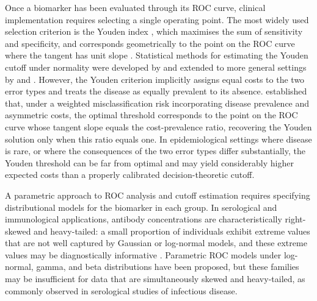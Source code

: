 \documentclass[11pt,a4paper]{article}
\theoremstyle{definition}
\theoremstyle{remark}
\newcommand{\1}{\mathbf{1}}
\begin{document}
Once a biomarker has been evaluated through its ROC curve, clinical
implementation requires selecting a single operating point. The most
widely used selection criterion is the Youden index
\citep{youden1950index}, which maximises the sum of sensitivity and
specificity, and corresponds geometrically to the point on the ROC curve
where the tangent has unit slope \citep{metz1978basic}. Statistical
methods for estimating the Youden cutoff under normality were developed
by \citet{fluss2005estimation} and extended to more general settings by
\citet{schisterman2005optimal} and \citet{perkins2006inconsistency}.
However, the Youden criterion implicitly assigns equal costs to the two
error types and treats the disease as equally prevalent to its absence.
\citet{mcintosh2002combining} established that, under a weighted
misclassification risk incorporating disease prevalence and asymmetric
costs, the optimal threshold corresponds to the point on the ROC curve
whose tangent slope equals the cost-prevalence ratio, recovering the
Youden solution only when this ratio equals one. In epidemiological
settings where disease is rare, or where the consequences of the two
error types differ substantially, the Youden threshold can be far from
optimal and may yield considerably higher expected costs than a properly
calibrated decision-theoretic cutoff.

A parametric approach to ROC analysis and cutoff estimation requires
specifying distributional models for the biomarker in each group. In
serological and immunological applications, antibody concentrations are
characteristically right-skewed and heavy-tailed: a small proportion of
individuals exhibit extreme values that are not well captured by
Gaussian or log-normal models, and these extreme values may be
diagnostically informative \citep{lachos2010likelihood}. Parametric ROC
models under log-normal, gamma, and beta distributions have been
proposed, but these families may be insufficient for data that are
simultaneously skewed and heavy-tailed, as commonly observed in
serological studies of infectious disease.
\end{document}
